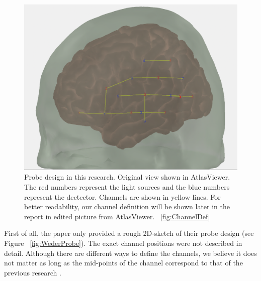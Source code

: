 \begin{figure}[H]
  \centering
    \includegraphics[scale=.32]{bilder/atlas_probe.png}
  \caption{Probe design in this research. Original view shown in AtlasViewer. The red numbers represent the light sources and the blue numbers represent the dectector. Channels are shown in yellow lines. For better readability, our channel definition will be shown later in the report in edited picture from AtlasViewer. ~\ref{fig:ChannelDef} }
  \label{fig:atlas}
\end{figure}


First of all, the paper only provided a rough 2D-sketch of their probe design (see Figure ~\ref{fig:WederProbe}). The exact channel positions were not described in detail. Although there are different ways to define the channels, we believe it does not matter as long as the mid-points of the channel correspond to that of the previous research \citep {Weder2018}.



